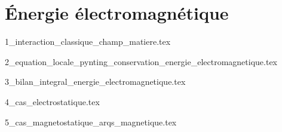 \chapter{Énergie électromagnétique}

\minitoc

{1_interaction_classique_champ_matiere.tex}

{2_equation_locale_pynting_conservation_energie_electromagnetique.tex}

{3_bilan_integral_energie_electromagnetique.tex}

{4_cas_electrostatique.tex}

{5_cas_magnetostatique_arqs_magnetique.tex}
